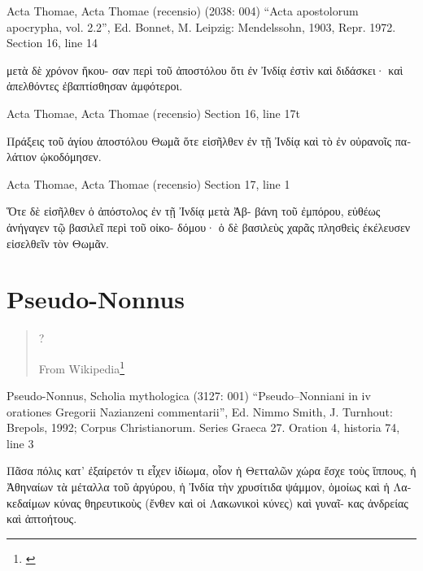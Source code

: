 \documentclass[12pt,letterpaper,twoside,final]{memoir}
\begin{document}
\begin{greek}
Acta Thomae, Acta Thomae (recensio) (2038: 004)
“Acta apostolorum apocrypha, vol. 2.2”, Ed. Bonnet, M.
Leipzig: Mendelssohn, 1903, Repr. 1972.
Section 16, line 14

                                             μετὰ δὲ χρόνον ἤκου-
σαν περὶ τοῦ ἀποστόλου ὅτι ἐν Ἰνδίᾳ ἐστὶν καὶ διδάσκει· καὶ 
ἀπελθόντες ἐβαπτίσθησαν ἀμφότεροι. 



Acta Thomae, Acta Thomae (recensio) 
Section 16, line 17t

Πράξεις τοῦ ἁγίου ἀποστόλου Θωμᾶ ὅτε εἰσῆλθεν ἐν τῇ 
Ἰνδίᾳ καὶ τὸ ἐν οὐρανοῖς παλάτιον ᾠκοδόμησεν. 




Acta Thomae, Acta Thomae (recensio) 
Section 17, line 1

Ὅτε δὲ εἰσῆλθεν ὁ ἀπόστολος ἐν τῇ Ἰνδίᾳ μετὰ Ἀβ-
βάνη τοῦ ἐμπόρου, εὐθέως ἀνήγαγεν τῷ βασιλεῖ περὶ τοῦ οἰκο-
δόμου· ὁ δὲ βασιλεὺς χαρᾶς πλησθεὶς ἐκέλευσεν εἰσελθεῖν τὸν 
Θωμᾶν. 


\end{greek}

\section{Pseudo-Nonnus}
\blockquote[From Wikipedia\footnote{\url{}}]{?}
\begin{greek}

Pseudo-Nonnus, Scholia mythologica (3127: 001)
“Pseudo–Nonniani in iv orationes Gregorii Nazianzeni commentarii”, Ed. Nimmo Smith, J.
Turnhout: Brepols, 1992; Corpus Christianorum. Series Graeca 27.
Oration 4, historia 74, line 3

Πᾶσα πόλις κατ' ἐξαίρετόν τι εἶχεν ἰδίωμα, οἷον ἡ Θετταλῶν 
χώρα ἔσχε τοὺς ἵππους, ἡ Ἀθηναίων τὰ μέταλλα τοῦ ἀργύρου, 
ἡ Ἰνδία τὴν χρυσίτιδα ψάμμον, ὁμοίως καὶ ἡ Λακεδαίμων 
κύνας θηρευτικοὺς (ἔνθεν καὶ οἱ Λακωνικοὶ κύνες) καὶ γυναῖ-
κας ἀνδρείας καὶ ἀπτοήτους. 

\end{greek}
\end{document}
